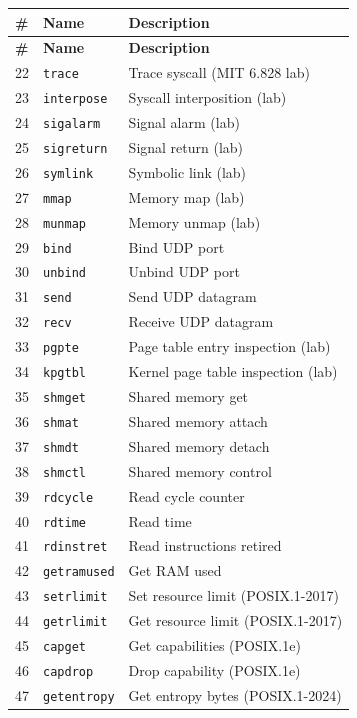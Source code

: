 \documentclass[11pt,a4paper]{article}
\begin{document}
\begin{longtable}{@{}p{0.7cm}p{3.2cm}p{9.5cm}@{}}
\toprule
\textbf{\#} & \textbf{Name} & \textbf{Description} \\
\midrule
\endfirsthead
\toprule
\textbf{\#} & \textbf{Name} & \textbf{Description} \\
\midrule
\endhead
22 & \texttt{trace} & Trace syscall (MIT 6.828 lab) \\
23 & \texttt{interpose} & Syscall interposition (lab) \\
24 & \texttt{sigalarm} & Signal alarm (lab) \\
25 & \texttt{sigreturn} & Signal return (lab) \\
26 & \texttt{symlink} & Symbolic link (lab) \\
27 & \texttt{mmap} & Memory map (lab) \\
28 & \texttt{munmap} & Memory unmap (lab) \\
29 & \texttt{bind} & Bind UDP port \\
30 & \texttt{unbind} & Unbind UDP port \\
31 & \texttt{send} & Send UDP datagram \\
32 & \texttt{recv} & Receive UDP datagram \\
33 & \texttt{pgpte} & Page table entry inspection (lab) \\
34 & \texttt{kpgtbl} & Kernel page table inspection (lab) \\
35 & \texttt{shmget} & Shared memory get \\
36 & \texttt{shmat} & Shared memory attach \\
37 & \texttt{shmdt} & Shared memory detach \\
38 & \texttt{shmctl} & Shared memory control \\
39 & \texttt{rdcycle} & Read cycle counter \\
40 & \texttt{rdtime} & Read time \\
41 & \texttt{rdinstret} & Read instructions retired \\
42 & \texttt{getramused} & Get RAM used \\
43 & \texttt{setrlimit} & Set resource limit (POSIX.1-2017) \\
44 & \texttt{getrlimit} & Get resource limit (POSIX.1-2017) \\
45 & \texttt{capget} & Get capabilities (POSIX.1e) \\
46 & \texttt{capdrop} & Drop capability (POSIX.1e) \\
47 & \texttt{getentropy} & Get entropy bytes (POSIX.1-2024) \\

\end{longtable}
\end{document}
